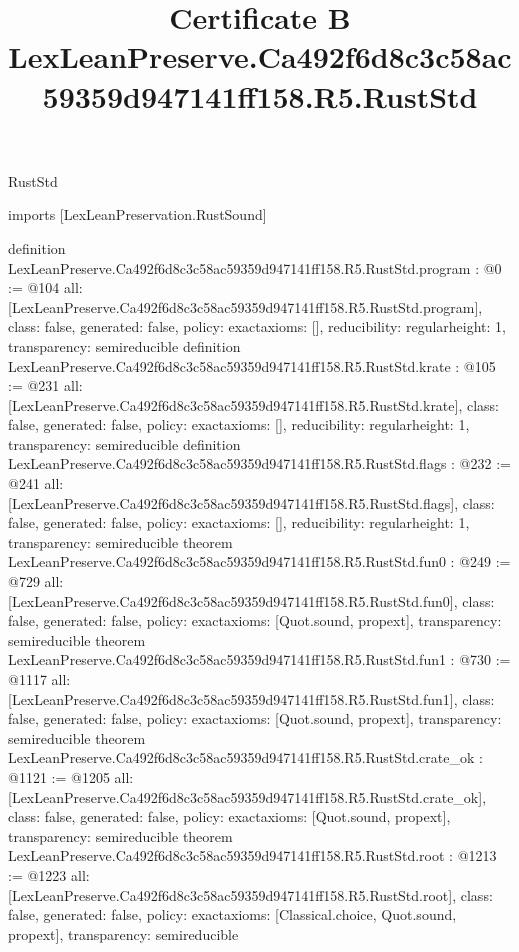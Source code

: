 \begin{lexlean}{RustStd}
\title{Certificate B LexLeanPreserve.Ca492f6d8c3c58ac59359d947141ff158.R5.RustStd}
\begin{coremodule}
imports [LexLeanPreservation.RustSound]

definition LexLeanPreserve.Ca492f6d8c3c58ac59359d947141ff158.R5.RustStd.program : @0 := @104 {
  all: [LexLeanPreserve.Ca492f6d8c3c58ac59359d947141ff158.R5.RustStd.program],
  class: false,
  generated: false,
  policy: exact{axioms: []},
  reducibility: regular{height: 1},
  transparency: semireducible
}
definition LexLeanPreserve.Ca492f6d8c3c58ac59359d947141ff158.R5.RustStd.krate : @105 := @231 {
  all: [LexLeanPreserve.Ca492f6d8c3c58ac59359d947141ff158.R5.RustStd.krate],
  class: false,
  generated: false,
  policy: exact{axioms: []},
  reducibility: regular{height: 1},
  transparency: semireducible
}
definition LexLeanPreserve.Ca492f6d8c3c58ac59359d947141ff158.R5.RustStd.flags : @232 := @241 {
  all: [LexLeanPreserve.Ca492f6d8c3c58ac59359d947141ff158.R5.RustStd.flags],
  class: false,
  generated: false,
  policy: exact{axioms: []},
  reducibility: regular{height: 1},
  transparency: semireducible
}
theorem LexLeanPreserve.Ca492f6d8c3c58ac59359d947141ff158.R5.RustStd.fun0 : @249 := @729 {
  all: [LexLeanPreserve.Ca492f6d8c3c58ac59359d947141ff158.R5.RustStd.fun0],
  class: false,
  generated: false,
  policy: exact{axioms: [Quot.sound, propext]},
  transparency: semireducible
}
theorem LexLeanPreserve.Ca492f6d8c3c58ac59359d947141ff158.R5.RustStd.fun1 : @730 := @1117 {
  all: [LexLeanPreserve.Ca492f6d8c3c58ac59359d947141ff158.R5.RustStd.fun1],
  class: false,
  generated: false,
  policy: exact{axioms: [Quot.sound, propext]},
  transparency: semireducible
}
theorem LexLeanPreserve.Ca492f6d8c3c58ac59359d947141ff158.R5.RustStd.crate_ok : @1121 := @1205 {
  all: [LexLeanPreserve.Ca492f6d8c3c58ac59359d947141ff158.R5.RustStd.crate_ok],
  class: false,
  generated: false,
  policy: exact{axioms: [Quot.sound, propext]},
  transparency: semireducible
}
theorem LexLeanPreserve.Ca492f6d8c3c58ac59359d947141ff158.R5.RustStd.root : @1213 := @1223 {
  all: [LexLeanPreserve.Ca492f6d8c3c58ac59359d947141ff158.R5.RustStd.root],
  class: false,
  generated: false,
  policy: exact{axioms: [Classical.choice, Quot.sound, propext]},
  transparency: semireducible
}


\end{coremodule}
\end{lexlean}
